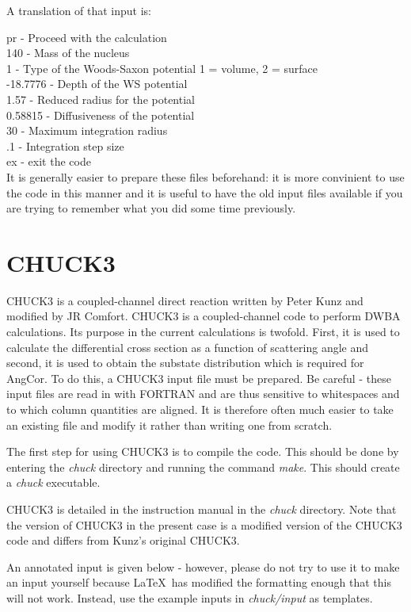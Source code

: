 \documentclass[a4paper,10pt]{article}
\begin{document}
A translation of that input is:
\newline

\noindent pr - Proceed with the calculation\\
140 - Mass of the nucleus\\
1 - Type of the Woods-Saxon potential 1 = volume, 2 = surface\\
-18.7776 - Depth of the WS potential\\
1.57 - Reduced radius for the potential\\
0.58815 - Diffusiveness of the potential\\
30 - Maximum integration radius\\
.1 - Integration step size\\
ex - exit the code\\

It is generally easier to prepare these files beforehand: it is more convinient to use the code in this manner and it is useful to have the old input files available if you are trying to remember what you did some time previously.


\section{CHUCK3}

CHUCK3 is a coupled-channel direct reaction written by Peter Kunz and modified by JR Comfort. CHUCK3 is a coupled-channel code to perform DWBA calculations. Its purpose in the current calculations is twofold. First, it is used to calculate the differential cross section as a function of scattering angle and second, it is used to obtain the substate distribution which is required for AngCor. To do this, a CHUCK3 input file must be prepared. Be careful - these input files are read in with FORTRAN and are thus sensitive to whitespaces and to which column quantities are aligned. It is therefore often much easier to take an existing file and modify it rather than writing one from scratch.

The first step for using CHUCK3 is to compile the code. This should be done by entering the {\it chuck} directory and running the command {\it make}. This should create a {\it chuck} executable.

CHUCK3 is detailed in the instruction manual in the {\it chuck} directory. Note that the version of CHUCK3 in the present case is a modified version of the CHUCK3 code and differs from Kunz's original CHUCK3.

An annotated input is given below - however, please do not try to use it to make an input yourself because \LaTeX\ has modified the formatting enough that this will not work. Instead, use the example inputs in {\it chuck/input} as templates.
\end{document}
